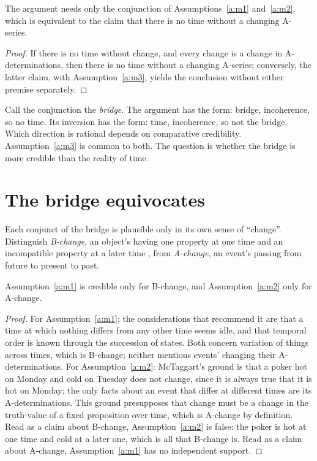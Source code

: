 \documentclass{situationist-preprint}
\begin{document}
\begin{proposition}\label{p:equiv}
The argument needs only the conjunction of Assumptions~\ref{a:m1} and~\ref{a:m2}, which is equivalent to the claim that there is no time without a changing A-series.
\end{proposition}

\begin{proof}
If there is no time without change, and every change is a change in A-determinations, then there is no time without a changing A-series; conversely, the latter claim, with Assumption~\ref{a:m3}, yields the conclusion without either premise separately.
\end{proof}

Call the conjunction the \emph{bridge}. The argument has the form: bridge, incoherence, so no time. Its inversion has the form: time, incoherence, so not the bridge. Which direction is rational depends on comparative credibility. Assumption~\ref{a:m3} is common to both. The question is whether the bridge is more credible than the reality of time.

\section{The bridge equivocates}

Each conjunct of the bridge is plausible only in its own sense of \enquote{change}. Distinguish \emph{B-change}, an object's having one property at one time and an incompatible property at a later time \citep[§442]{Russell1903}, from \emph{A-change}, an event's passing from future to present to past.

\begin{proposition}\label{p:split}
Assumption~\ref{a:m1} is credible only for B-change, and Assumption~\ref{a:m2} only for A-change.
\end{proposition}

\begin{proof}
For Assumption~\ref{a:m1}: the considerations that recommend it are that a time at which nothing differs from any other time seems idle, and that temporal order is known through the succession of states. Both concern variation of things across times, which is B-change; neither mentions events' changing their A-determinations. For Assumption~\ref{a:m2}: McTaggart's ground is that a poker hot on Monday and cold on Tuesday does not change, since it is always true that it is hot on Monday; the only facts about an event that differ at different times are its A-determinations. This ground presupposes that change must be a change in the truth-value of a fixed proposition over time, which is A-change by definition. Read as a claim about B-change, Assumption~\ref{a:m2} is false: the poker is hot at one time and cold at a later one, which is all that B-change is. Read as a claim about A-change, Assumption~\ref{a:m1} has no independent support.
\end{proof}
\end{document}
